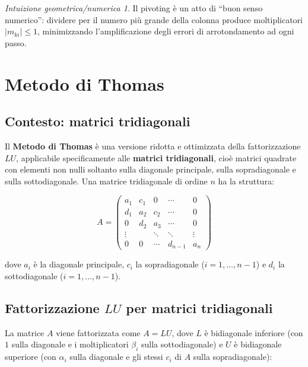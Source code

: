 \documentclass[a4paper,12pt]{article}
\theoremstyle{definition}
\theoremstyle{remark}
\newtheorem*{intuizione}{Intuizione geometrica/numerica}
\begin{document}
\begin{intuizione}
Il pivoting è un atto di ``buon senso numerico'': dividere per il numero
più grande della colonna produce moltiplicatori $|m_{ki}| \le 1$,
minimizzando l'amplificazione degli errori di arrotondamento ad ogni passo.
\end{intuizione}

\section{Metodo di Thomas}

\subsection{Contesto: matrici tridiagonali}

Il \textbf{Metodo di Thomas} è una versione ridotta e ottimizzata della
fattorizzazione $LU$, applicabile specificamente alle \textbf{matrici
tridiagonali}, cioè matrici quadrate con elementi non nulli soltanto sulla
diagonale principale, sulla sopradiagonale e sulla sottodiagonale. Una
matrice tridiagonale di ordine $n$ ha la struttura:

\[
  A =
  \begin{pmatrix}
    a_1  & c_1  & 0    & \cdots & 0      \\
    d_1  & a_2  & c_2  & \cdots & 0      \\
    0    & d_2  & a_3  & \cdots & 0      \\
    \vdots &   & \ddots & \ddots & \vdots \\
    0    & 0    & \cdots & d_{n-1} & a_n
  \end{pmatrix}
\]

\noindent dove $a_i$ è la diagonale principale, $c_i$ la sopradiagonale
($i=1,\ldots,n-1$) e $d_i$ la sottodiagonale ($i=1,\ldots,n-1$).

\subsection{Fattorizzazione $LU$ per matrici tridiagonali}

La matrice $A$ viene fattorizzata come $A = LU$, dove $L$ è bidiagonale
inferiore (con $1$ sulla diagonale e i moltiplicatori $\beta_i$ sulla
sottodiagonale) e $U$ è bidiagonale superiore (con $\alpha_i$ sulla
diagonale e gli stessi $c_i$ di $A$ sulla sopradiagonale):
\end{document}
